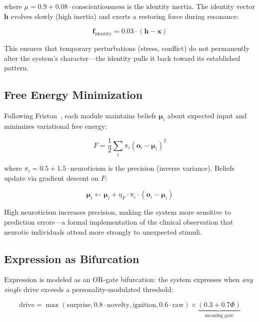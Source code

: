 \documentclass[11pt]{article}
\begin{document}
where $\mu = 0.9 + 0.08 \cdot \text{conscientiousness}$ is the identity inertia. The identity vector $\mathbf{h}$ evolves slowly (high inertia) and exerts a restoring force during resonance:

\begin{equation}
\mathbf{f}_{\text{identity}} = 0.03 \cdot (\mathbf{h} - \mathbf{x})
\end{equation}

This ensures that temporary perturbations (stress, conflict) do not permanently alter the system's character---the identity pulls it back toward its established pattern.

\subsection{Free Energy Minimization}
\label{sec:freeenergy}

Following Friston~\cite{friston2010}, each module maintains beliefs $\boldsymbol{\mu}_i$ about expected input and minimizes variational free energy:

\begin{equation}
F = \frac{1}{2}\sum_i \pi_i (\mathbf{o}_i - \boldsymbol{\mu}_i)^2
\end{equation}

where $\pi_i = 0.5 + 1.5 \cdot \text{neuroticism}$ is the precision (inverse variance). Beliefs update via gradient descent on $F$:

\begin{equation}
\boldsymbol{\mu}_i \leftarrow \boldsymbol{\mu}_i + \eta_F \cdot \pi_i \cdot (\mathbf{o}_i - \boldsymbol{\mu}_i)
\end{equation}

High neuroticism increases precision, making the system more sensitive to prediction errors---a formal implementation of the clinical observation that neurotic individuals attend more strongly to unexpected stimuli.

\subsection{Expression as Bifurcation}
\label{sec:expression}

Expression is modeled as an OR-gate bifurcation: the system expresses when \emph{any single} drive exceeds a personality-modulated threshold:

\begin{equation}
\text{drive} = \max(\text{surprise}, 0.8 \cdot \text{novelty}, \text{ignition}, 0.6 \cdot \text{raw}) \times \underbrace{(0.3 + 0.7\Phi)}_{\text{meaning gate}}
\label{eq:expression}
\end{equation}
\end{document}
